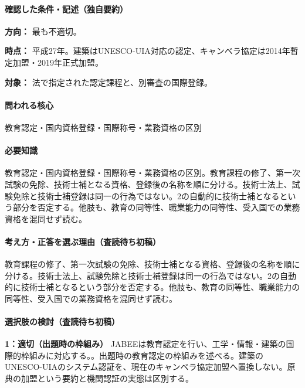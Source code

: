 \paragraph{確認した条件・記述（独自要約）}\mbox{}\par

\noindent\textbf{方向：} 最も不適切。\par

\noindent\textbf{時点：} 平成27年。建築はUNESCO-UIA対応の認定、キャンベラ協定は2014年暫定加盟・2019年正式加盟。\par

\noindent\textbf{対象：} 法で指定された認定課程と、別審査の国際登録。\par

\paragraph{問われる核心} 教育認定・国内資格登録・国際称号・業務資格の区別

\paragraph{必要知識} 教育認定・国内資格登録・国際称号・業務資格の区別。教育課程の修了、第一次試験の免除、技術士補となる資格、登録後の名称を順に分ける。技術士法上、試験免除と技術士補登録は同一の行為ではない。2の自動的に技術士補となるという部分を否定する。他肢も、教育の同等性、職業能力の同等性、受入国での業務資格を混同せず読む。

\paragraph{考え方・正答を選ぶ理由（査読待ち初稿）} 教育課程の修了、第一次試験の免除、技術士補となる資格、登録後の名称を順に分ける。技術士法上、試験免除と技術士補登録は同一の行為ではない。2の自動的に技術士補となるという部分を否定する。他肢も、教育の同等性、職業能力の同等性、受入国での業務資格を混同せず読む。

\paragraph{選択肢の検討（査読待ち初稿）}\mbox{}\par

\noindent\textbf{1：適切（出題時の枠組み）} JABEEは教育認定を行い、工学・情報・建築の国際的枠組みに対応する。。出題時の教育認定の枠組みを述べる。建築のUNESCO-UIAのシステム認証を、現在のキャンベラ協定加盟へ置換しない。原典の加盟という要約と機関認証の実態は区別する。\par

